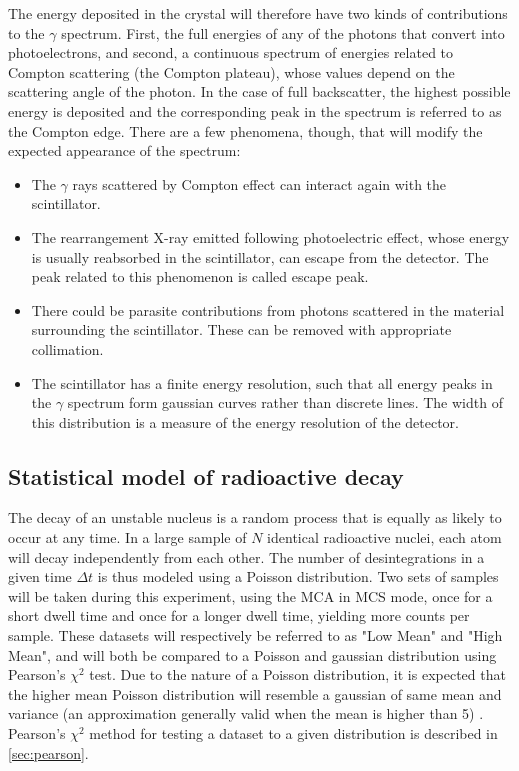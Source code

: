 The energy deposited in the crystal will therefore have two kinds of contributions to the $\gamma$ spectrum.
First, the full energies of any of the photons that convert into photoelectrons, 
and second, a continuous spectrum of energies related to Compton scattering (the Compton plateau), 
whose values depend on the scattering angle of the photon.
In the case of full backscatter, the highest possible energy is deposited
and the corresponding peak in the spectrum is referred to as the Compton edge.
There are a few phenomena, though, that will modify the expected appearance of the spectrum:
\begin{itemize}
    \item The $\gamma$ rays scattered by Compton effect can interact again with the scintillator.
    \item The rearrangement X-ray emitted following photoelectric effect, whose energy is usually reabsorbed in the scintillator, can escape from the detector.
    The peak related to this phenomenon is called escape peak.
    \item There could be parasite contributions from photons scattered in the material surrounding the scintillator. 
    These can be removed with appropriate collimation.
    \item The scintillator has a finite energy resolution, such that all energy peaks in the $\gamma$ spectrum form gaussian curves rather than discrete lines. The width of this distribution is a measure of the energy resolution of the detector.
\end{itemize}

\subsection{Statistical model of radioactive decay}
\label{sec:statistics}

The decay of an unstable nucleus is a random process that is equally as likely to occur at any time. 
In a large sample of \(N\) identical radioactive nuclei, each atom will decay independently from each other. 
The number of desintegrations in a given time \(\Delta t\) is thus modeled 
using a Poisson distribution. Two sets of samples will be taken during this 
experiment, using the MCA in MCS mode, once for a short dwell time and once for a 
longer dwell time, yielding more counts per sample. These datasets will 
respectively be referred to as "Low Mean" and "High Mean", and will 
both be compared to a Poisson and gaussian distribution using Pearson's 
\(\chi^2\) test. Due to the nature of a Poisson distribution, it is expected that 
the higher mean Poisson distribution will resemble a gaussian of same mean and 
variance (an approximation generally valid when the mean is higher than 5) \cite{statistics_nuclear_particle_physicists}. Pearson's \(\chi^2\) method for testing a dataset to a given 
distribution is described in \autoref{sec:pearson}. 

